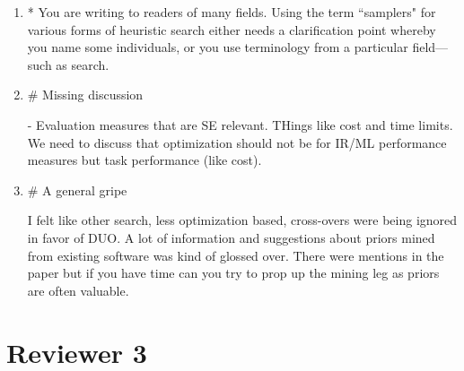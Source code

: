 \documentclass{article}
\newenvironment{com}{\color{blue}\begin{itshape}}{\end{itshape}\vspace{1ex}}
\begin{document}
\begin{enumerate}
\item \begin{com}
* You are writing to readers of many fields. Using the term ``samplers"
  for various forms of heuristic search either needs a clarification
  point whereby you name some individuals, or you use terminology from
  a particular field---such as search.
\end{com}

\item \begin{com}
\# Missing discussion

- Evaluation measures that are SE relevant. THings like cost and time
  limits. We need to discuss that optimization should not be for
  IR/ML performance measures but task performance (like cost).
\end{com}

\item \begin{com}
\# A general gripe

I felt like other search, less optimization based, cross-overs were being
 ignored in favor of DUO. A lot of information and suggestions about priors
 mined from existing software was kind of glossed over. There were 
mentions in the paper but if you have time can you try to prop up the mining
 leg as priors are often valuable.
 \end{com}
\end{enumerate}

\section*{Reviewer 3}
\label{sec:Reviewer3}
\renewcommand*{\theenumi}{3.\arabic{enumi}}
\renewcommand*{\theenumii}{\theenumi.\arabic{enumii}}
\end{document}
